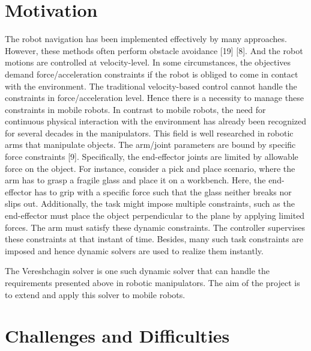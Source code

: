 \section{Motivation}

The robot navigation has been implemented effectively by many approaches. However, these methods often perform obstacle avoidance [19] [8]. And the robot motions are controlled at velocity-level. In some circumstances, the objectives demand force/acceleration constraints if the robot is obliged to come in contact with the environment. The traditional velocity-based control cannot handle the constraints in force/acceleration level. Hence there is a necessity to manage these constraints in mobile robots.
In contrast to mobile robots, the need for continuous physical interaction with the environment has already been recognized for several decades in the manipulators. This field is well researched in robotic arms that manipulate objects. The arm/joint parameters are bound by specific force constraints [9]. Specifically, the end-effector joints are limited by allowable force on the object. For instance, consider a pick and place scenario, where the arm has to grasp a fragile glass and place it on a workbench. Here, the end-effector has to grip with a specific force such that the glass neither breaks nor slips out. Additionally, the task might impose multiple constraints, such as the end-effector must place the object perpendicular to the plane by applying limited forces. The arm must satisfy these dynamic constraints. The controller supervises these constraints at that instant of time. Besides, many such task constraints are imposed and hence dynamic solvers are used to realize them instantly.

The Vereshchagin solver is one such dynamic solver that can handle the requirements presented above in robotic manipulators. The aim of the project is to extend and apply this solver to mobile robots.



\section{Challenges and Difficulties}

